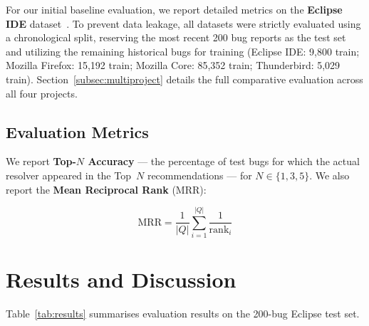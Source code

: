 \documentclass[sigconf,review,anonymous]{acmart}
\begin{document}
For our initial baseline evaluation, we report detailed metrics on the \textbf{Eclipse IDE} dataset~\cite{lamkanfi2013msr}. To prevent data leakage, all datasets were strictly evaluated using a chronological split, reserving the most recent 200 bug reports as the test set and utilizing the remaining historical bugs for training (Eclipse IDE: 9,800 train; Mozilla Firefox: 15,192 train; Mozilla Core: 85,352 train; Thunderbird: 5,029 train). Section~\ref{subsec:multiproject} details the full comparative evaluation across all four projects.

\subsection{Evaluation Metrics}

We report \textbf{Top-$N$ Accuracy} — the percentage of test bugs for which
the actual resolver appeared in the Top~$N$ recommendations — for
$N \in \{1, 3, 5\}$.
We also report the \textbf{Mean Reciprocal Rank} (MRR):

\begin{equation}
\text{MRR} = \frac{1}{|Q|}\sum_{i=1}^{|Q|}\frac{1}{\text{rank}_i}
\label{eq:mrr}
\end{equation}

\section{Results and Discussion}

Table~\ref{tab:results} summarises evaluation results on the 200-bug Eclipse test set.

\begin{table}[h]
\centering
\small
\caption{Performance comparison: WSM Baseline vs.\ XGBRanker (LTR) on the
         Eclipse IDE dataset (200-bug test set).}
\label{tab:results}
\end{table}
\end{document}
